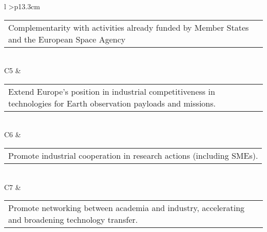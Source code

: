 \begin{longtable}[H]{l >{\centering\arraybackslash}p{13.3cm}}
\begin{tabular}[c]{@{}l@{}}
\begin{minipage}[t]{\linewidth}
Complementarity with activities already funded by Member States and the European Space Agency \vspace{0.3cm}
	\end{minipage} \end{tabular}                                                                                                                                           \\  \midrule
	C5 & \begin{tabular}[c]{@{}l@{}}\begin{minipage}[t]{\linewidth}
Extend Europe's position in industrial competitiveness in technologies for Earth observation payloads and missions. \vspace{0.3cm}
	\end{minipage} \end{tabular}                                                                                                                                             \\  \midrule
	C6 & \begin{tabular}[c]{@{}l@{}}\begin{minipage}[t]{\linewidth}
			Promote industrial cooperation in research actions (including SMEs). \vspace{0.3cm}
	\end{minipage} \end{tabular}                                                                                                                                          \\  \midrule
	C7 & \begin{tabular}[c]{@{}l@{}}\begin{minipage}[t]{\linewidth}
			Promote networking between academia and industry, accelerating and broadening technology transfer. \vspace{0.3cm}
	\end{minipage} \end{tabular}                                                                                                                                             \\                                                                   	\bottomrule[2pt]
	\caption{Call of proposal requirements}
\end{longtable}

